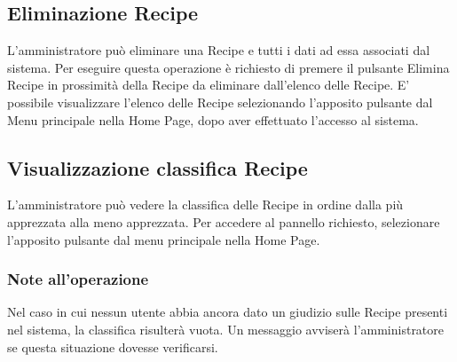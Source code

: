 	
	\subsection{Eliminazione Recipe}
	L'amministratore può eliminare una Recipe e tutti i dati ad essa associati dal sistema.
	Per eseguire questa operazione è richiesto di premere il pulsante Elimina Recipe in prossimità della Recipe da eliminare dall'elenco delle Recipe. 
	E' possibile visualizzare l'elenco delle Recipe selezionando l'apposito pulsante dal Menu principale nella Home Page, dopo aver effettuato l'accesso al sistema.
	
	
	\subsection{Visualizzazione classifica Recipe}
	L'amministratore può vedere la classifica delle Recipe in ordine dalla più apprezzata alla meno apprezzata.
	Per accedere al pannello richiesto, selezionare l'apposito pulsante dal menu principale nella Home Page.
	\subsubsection{Note all'operazione}
	Nel caso in cui nessun utente abbia ancora dato un giudizio sulle Recipe presenti nel sistema, la classifica risulterà vuota.
	Un messaggio avviserà l'amministratore se questa situazione dovesse verificarsi.
	
